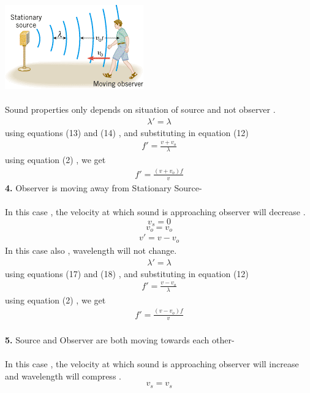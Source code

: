 \documentclass[journal,12pt,twocolumn]{IEEEtran}
\theoremstyle{remark}
\begin{document}
    \includegraphics[width=0.9\linewidth]{figs/wave3.png}\\\\
Sound properties only depends on situation of source and not observer .
\begin{align}\lambda' = \lambda\end{align}
using equations (13) and (14) , and substituting in equation (12) 
\begin{align}f' = \frac{v+v_o}{\lambda}\end{align}
using equation (2) , we get 
\begin{align}f' = \frac{(v+v_o) f}{v }\end{align}
\textbf{4.} Observer is moving away from Stationary Source-\\\\
In this case , the velocity at which sound is approaching observer will decrease .
$$v_s = 0$$
$$v_o = v_o$$
\begin{align}v'= v-v_o\end{align}
In this case also , wavelength will not change.
\begin{align}\lambda' = \lambda\end{align}
using equations (17) and (18) , and substituting in equation (12) 
\begin{align}f' = \frac{v-v_o}{\lambda}\end{align}
using equation (2) , we get 
\begin{align}f' = \frac{(v-v_o) f}{v }\end{align}\\
\textbf{5.} Source and Observer are both moving towards each other-\\\\
In this case , the velocity at which sound is approaching observer will increase and wavelength will compress .
$$v_s = v_s$$
\end{document}
